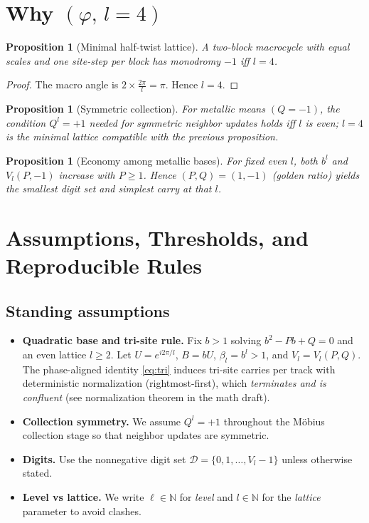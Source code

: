 \documentclass[11pt]{article}
\newtheorem{proposition}[theorem]{Proposition}
\theoremstyle{definition}
\theoremstyle{remark}
\newcommand{\N}{\mathbb{N}}
\begin{document}
\section{Why $(\varphi,\,l=4)$}
\label{sec:why-phi-l4}

\begin{proposition}[Minimal half-twist lattice]
A two-block macrocycle with equal scales and one site-step per block has monodromy $-1$ iff $l=4$.
\end{proposition}

\begin{proof}
The macro angle is $2\times \frac{2\pi}{l}=\pi$. Hence $l=4$.
\end{proof}

\begin{proposition}[Symmetric collection]
For metallic means $(Q=-1)$, the condition $Q^l=+1$ needed for symmetric neighbor updates holds iff $l$ is even; $l=4$ is the minimal lattice compatible with the previous proposition.
\end{proposition}

\begin{proposition}[Economy among metallic bases]
For fixed even $l$, both $b^l$ and $V_l(P,-1)$ increase with $P\ge1$. Hence $(P,Q)=(1,-1)$ (golden ratio) yields the smallest digit set and simplest carry at that $l$.
\end{proposition}
\section{Assumptions, Thresholds, and Reproducible Rules}
\label{sec:assump-thresholds}

\subsection*{Standing assumptions}
\begin{itemize}
  \item \textbf{Quadratic base and tri-site rule.} Fix $b>1$ solving $b^2-Pb+Q=0$ and an even lattice $l\ge 2$. Let $U=e^{i2\pi/l}$, $B=bU$, $\beta_l=b^l>1$, and $V_l=V_l(P,Q)$. The phase-aligned identity \eqref{eq:tri} induces tri-site carries per track with deterministic normalization (rightmost-first), which \emph{terminates and is confluent} (see normalization theorem in the math draft).
  \item \textbf{Collection symmetry.} We assume $Q^l=+1$ throughout the M\"obius collection stage so that neighbor updates are symmetric.
  \item \textbf{Digits.} Use the nonnegative digit set $\mathcal D=\{0,1,\dots,V_l-1\}$ unless otherwise stated.
  \item \textbf{Level vs lattice.} We write $\ell\in\N$ for \emph{level} and $l\in\N$ for the \emph{lattice} parameter to avoid clashes.
\end{itemize}
\end{document}
